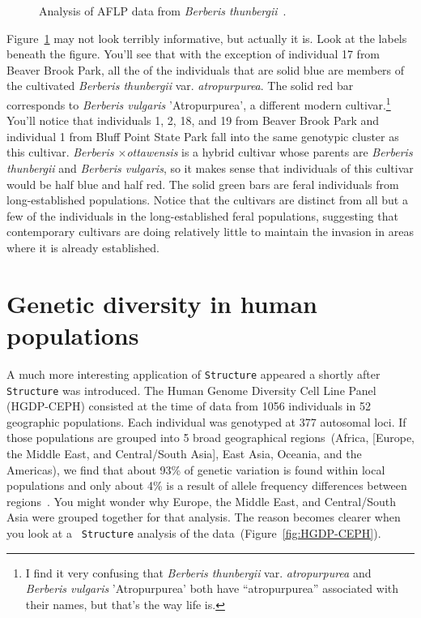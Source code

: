 \begin{figure}
\caption{Analysis of AFLP data from {\it Berberis
    thunbergii}~\cite{Lubell-etal-2008}.}\label{fig:lubell-structure} 
\end{figure}

Figure~\ref{fig:lubell-structure} may not look terribly informative,
but actually it is. Look at the labels beneath the figure. You'll see
that with the exception of individual 17 from Beaver Brook Park, all
the of the individuals that are solid blue are members of the
cultivated {\it Berberis thunbergii\/} var. {\it atropurpurea}. The
solid red bar corresponds to {\it Berberis vulgaris\/} 'Atropurpurea',
a different modern cultivar.\footnote{I find it very confusing that
  {\it Berberis thunbergii\/} var. {\it atropurpurea\/} and {\it
    Berberis vulgaris\/} 'Atropurpurea' both have ``atropurpurea''
  associated with their names, but that's the way life is.} You'll
notice that individuals 1, 2, 18, and 19 from Beaver Brook Park and
individual 1 from Bluff Point State Park fall into the same genotypic
cluster as this cultivar. {\it Berberis $\times$ottawensis} is a
hybrid cultivar whose parents are {\it Berberis thunbergii\/} and {\it
  Berberis vulgaris\/}, so it makes sense that individuals of this
cultivar would be half blue and half red. The solid green bars are
feral individuals from long-established populations. Notice that the
cultivars are distinct from all but a few of the individuals in the
long-established feral populations, suggesting that contemporary
cultivars are doing relatively little to maintain the invasion in
areas where it is already established.

\section*{Genetic diversity in human populations}

A much more interesting application of {\tt Structure} appeared a
shortly after {\tt Structure} was introduced. The Human Genome
Diversity Cell Line Panel (HGDP-CEPH) consisted at
the time of data from 1056 individuals in 52 geographic
populations. Each individual was genotyped at 377 autosomal loci. If
those populations are grouped into 5 broad geographical
regions~(Africa, [Europe, the Middle East, and Central/South Asia],
East Asia, Oceania, and the Americas), we find that about 93\% of
genetic variation is found within local populations and only about 4\%
is a result of allele frequency differences between
regions~\cite{Rosenberg-etal-2002}. You might wonder why Europe, the
Middle East, and Central/South Asia were grouped together for that
analysis. The reason becomes clearer when you look at a {\tt
  Structure} analysis of the data~(Figure~\ref{fig:HGDP-CEPH}).

